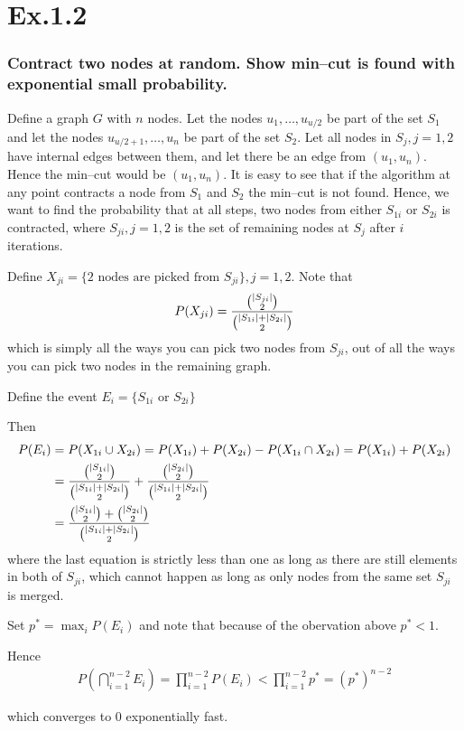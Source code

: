 \section{Ex.1.2}
\subsubsection*{Contract two nodes at random. Show min--cut is found with exponential small probability.}

Define a graph $G$ with $n$ nodes. Let the nodes $u_1,\ldots,u_{u/2}$ be part of the set $S_1$ and let the nodes $u_{u/2+1},\ldots,u_n$ be part of the set $S_2$. Let all nodes in $S_j, j=1,2$ have internal edges between them, and let there be an edge from $(u_1,u_n)$. Hence the min--cut would be $(u_1,u_n)$. It is easy to see that if the algorithm at any point contracts a node from $S_1$ and $S_2$ the min--cut is not found. Hence, we want to find the probability that at all steps, two nodes from either $S_{1i}$ or $S_{2i}$ is contracted, where $S_{ji}, j=1,2$ is the set of remaining nodes at $S_j$ after $i$ iterations.

Define $X_{ji} = \{ 2 \text{ nodes are picked from } S_{ji} \}, j=1,2$. Note that 
$$
P(X_{ji}) = \frac{\binom{\lvert S_{ji}\rvert}{2}}{\binom{\lvert S_{1i}\rvert + \lvert S_{2i}\rvert}{2}}
$$ 
which is simply all the ways you can pick two nodes from $S_{ji}$, out of all the ways you can pick two nodes in the remaining graph.

Define the event $E_i = \{ S_{1i} \text{ or } S_{2i}\}$

Then
\begin{align*}
P(E_i) &= P(X_{1i} \cup X_{2i}) = P(X_{1i}) + P(X_{2i}) - P(X_{1i} \cap X_{2i}) = P(X_{1i}) + P(X_{2i})\\
&=  \frac{\binom{\lvert S_{1i}\rvert}{2}}{\binom{\lvert S_{1i}\rvert + \lvert S_{2i}\rvert}{2}} + \frac{\binom{\lvert S_{2i}\rvert}{2}}{\binom{\lvert S_{1i}\rvert + \lvert S_{2i}\rvert}{2}}\\
&= \frac{\binom{\lvert S_{1i}\rvert}{2} + \binom{\lvert S_{2i}\rvert}{2}}{\binom{\lvert S_{1i}\rvert + \lvert S_{2i}\rvert}{2}}
\end{align*}
where the last equation is strictly less than one as long as there are still elements in both of $S_{ji}$, which cannot happen as long as only nodes from the same set $S_{ji}$ is merged.

Set $p^* = \max_{i} P(E_i)$ and note that because of the obervation above $p^*<1$.

Hence
\begin{align*}
P(\bigcap_{i=1}^{n-2} E_i) = \prod_{i=1}^{n-2}P(E_i) < \prod_{i=1}^{n-2}p^* = (p^*)^{n-2}
\end{align*}

which converges to 0 exponentially fast.